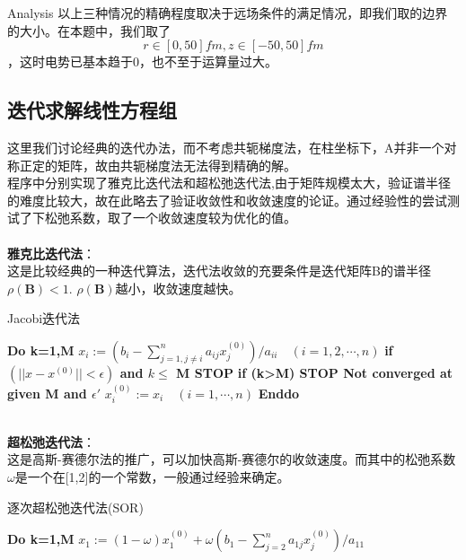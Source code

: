 \documentclass[letterpaper,12pt]{article}
\begin{document}
\begin{section}{Analysis}
            \indent 以上三种情况的精确程度取决于远场条件的满足情况，即我们取的边界的大小。在本题中，我们取了$$r\in[0,50]fm,z\in[-50,50]fm$$，这时电势已基本趋于0，也不至于运算量过大。

        \subsection{迭代求解线性方程组}
            这里我们讨论经典的迭代办法，而不考虑共轭梯度法，在柱坐标下，A并非一个对称正定的矩阵，故由共轭梯度法无法得到精确的解。\\
            \indent 程序中分别实现了雅克比迭代法和超松弛迭代法,由于矩阵规模太大，验证谱半径的难度比较大，故在此略去了验证收敛性和收敛速度的论证。通过经验性的尝试测试了下松弛系数，取了一个收敛速度较为优化的值。\\
            \\
            \textbf{雅克比迭代法}：\\
                这是比较经典的一种迭代算法，迭代法收敛的充要条件是迭代矩阵B的谱半径$\rho(\textbf{B})<1$. $\rho(\textbf{B})$越小，收敛速度越快。
                \begin{algorithm}[!htbp]  
                  \caption{Jacobi迭代法}  
                  \label{Jacobi迭代法}  
                  \begin{algorithmic}[1] 
                    \State \textbf{Do k=1,M}  
                    \State \quad $x_i:=(b_i-\sum\limits^n_{j=1,j\not =i}a_{ij}x_j^{(0)})/a_{ii}\quad (i=1,2,\cdots,n)$
                    \State \quad \textbf{if $(||x-x^{(0)}||<\epsilon)$ and $k\le$ M STOP}
                    \State \quad \textbf{if (k>M) STOP Not converged at given M and $\epsilon'$}
                    \State \quad $x_i^{(0)}:=x_i\quad (i=1,\cdots,n)$
                    \State \textbf{Enddo}
                  \end{algorithmic}  
                \end{algorithm}  
            \\
            \textbf{超松弛迭代法}：\\
                这是高斯-赛德尔法的推广，可以加快高斯-赛德尔的收敛速度。而其中的松弛系数$\omega$是一个在[1,2]的一个常数，一般通过经验来确定。
                \begin{algorithm}[!htbp]  
                  \caption{逐次超松弛迭代法(SOR)}  
                  \label{SOR迭代法}  
                  \begin{algorithmic}[1] 
                    \State \textbf{Do k=1,M}  
                    \State \quad $x_1:=(1-\omega)x_1^{(0)}+\omega(b_1-\sum\limits^n_{j=2}a_{1j}x_j^{(0)})/a_{11}$

\end{algorithmic}
\end{algorithm}
\end{section}
\end{document}
